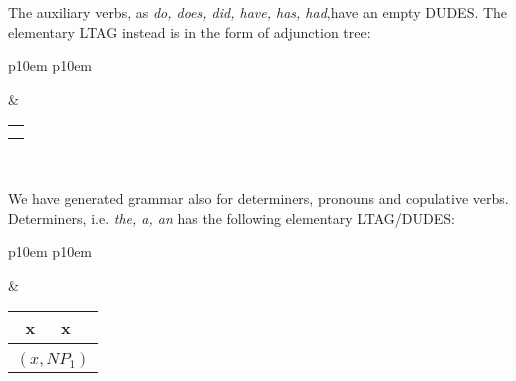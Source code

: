 The auxiliary verbs, as \textit{do, does, did, have, has, had},have an empty DUDES. The elementary LTAG instead is in the form of adjunction tree:
\medskip
\begin{center}
\begin{tabular}{ p{10em} p{10em} }
	\label{tbl:grammar.do}
	
	\begin{center}
		\begin{tikzpicture}
		\Tree [.S  [.V do ] [.S$^\ast$ ]]
		\end{tikzpicture}
	\end{center}
	&
	\begin{center}
		\begin{tabular}{|c|l|}
			\hline
			\mbox{} & \mbox{}\\ 
			\hline
			\multicolumn{2}{|l|}{
				\mbox{}
			} \\
			\hline
			\multicolumn{2}{|l|}{
				\mbox{}
			} \\
			\hline
		\end{tabular}
	\end{center}	
	\\
\end{tabular}
\end{center}
\medskip

We have generated grammar also for determiners, pronouns and copulative verbs. Determiners, i.e. \textit{the, a, an} has the following elementary LTAG/DUDES:
\medskip
\begin{center}
\begin{tabular}{ p{10em} p{10em} }
	\label{tbl:grammar.the}
	
	\begin{center}
		\begin{tikzpicture}
		\Tree [.DP  [.DET the ] [.NP$_1\downarrow$ ]]
		\end{tikzpicture}
	\end{center}
		
	&

	\begin{center}
		\begin{tabular}{|c|l|}
			\hline
			x & x\\ 
			\hline
			\multicolumn{2}{|l|}{
				\mbox{}
			} \\
			\hline
			\multicolumn{2}{|l|}{
				$(x,NP_{1})$
			} \\
			\hline
		\end{tabular}
	\end{center}	
	\\
\end{tabular}
\end{center}
\medskip

